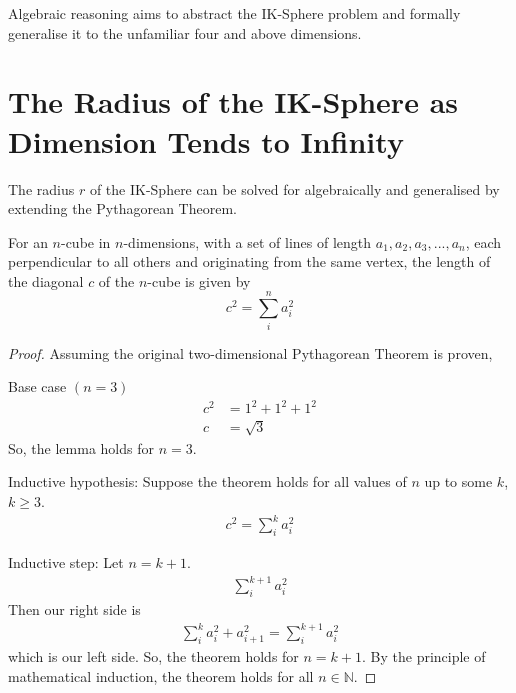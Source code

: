 \noindent Algebraic reasoning aims to abstract the IK-Sphere problem and formally generalise it to the unfamiliar four and above dimensions.

\section{The Radius of the IK-Sphere as Dimension Tends to Infinity}
The radius $r$ of the IK-Sphere can be solved for algebraically and generalised by extending the Pythagorean Theorem.
\begin{lemma}\label{lemma:extend pythag}
    For an $n$-cube in $n$-dimensions, with a set of lines of length $a_1, a_2, a_3, ... , a_n$, each perpendicular to all others and originating from the same vertex, the length of the diagonal $c$ of the $n$-cube is given by
    \begin{equation}\label{extendedpythag}
        c^2 = \sum_{i}^{n}a_i^2
    \end{equation}
\end{lemma}
\begin{proof}

    Assuming the original two-dimensional Pythagorean Theorem is proven,
    
    \noindent 
    Base case $\left(n=3\right)$
    \begin{equation*}
        \begin{split}
            c^2&=1^2+1^2+1^2\\
            c&=\sqrt{3}
        \end{split}
    \end{equation*}
    So, the lemma holds for $n=3$.
    
    \noindent Inductive hypothesis: Suppose the theorem holds for all values of $n$ up to some $k$, $k \geq 3$.
    \begin{equation*}
        \begin{split}
            c^2=\sum_{i}^{k}a_i^2
        \end{split}
    \end{equation*}
    
    \noindent Inductive step: Let $n=k+1$. 
    \begin{equation*}
        \begin{split}
        \sum_{i}^{k+1}a^2_{i}
        \end{split}
    \end{equation*}
    Then our right side is
    \begin{equation*}
        \begin{split}
        \sum_{i}^{k}a_i^2+a_{i+1}^2=\sum_{i}^{k+1}a^2_{i}
        \end{split}
    \end{equation*}
    which is our left side. So, the theorem holds for $n=k+1$. 
    By the principle of mathematical induction, the theorem holds for all $n \in \mathbb{N}$.
\end{proof}
